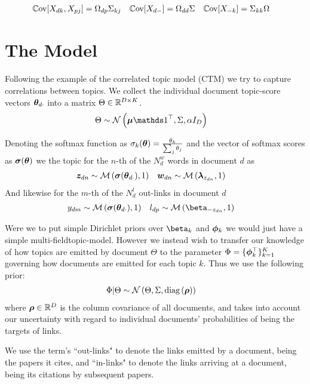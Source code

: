 \begin{align}
\mathbb{C}\text{ov}[ X_{dk}, X_{pj} ] & = \Omega_{dp} \Sigma_{kj} &
\mathbb{C}\text{ov}[ X_{d-} ] & = \Omega_{dd} \Sigma &
\mathbb{C}\text{ov}[ X_{-k} ] & = \Sigma_{kk} \Omega \label{eqn:sep-cov-forms}
\end{align}


\section{The Model}
Following the example of the correlated topic model (CTM)\cite{Blei2006} we try to capture correlations between topics. We collect the individual document topic-score vectors ${ \bm \theta_{d\cdot} }$ into a matrix $\Theta \in { \mathbb{R}^{D \times K} }$. 
\begin{align}
\Theta &\sim \mnor{\vv{\mu}\one\T}{\Sigma}{\alpha I_D}
\end{align}

Denoting the softmax function as $\sigma_k(\bm \theta) = \frac{\theta_k}{\sum_j \theta_j}$ and the vector of softmax scores as $\bm \sigma(\bm \theta)$ we 
the topic for the $n$-th of the $N^w_d$ words in document $d$ as
\begin{align}
{  \bm z _{dn} } & \sim \mathcal{M} \left( {\bm \sigma({ \bm \theta_{d\cdot} })},{1} \right) &
{ \bm w_{dn} } & \sim \mathcal{M} \left( {\bm \lambda_{z_{dn}}},{1} \right)
\end{align}
And likewise for the $m$-th of the $N^l_d$ out-links in document $d$
\begin{align}
y_{dm} & \sim \muln{\vv{\sigma}(\thdo)}{1} &
l_{dp} & \sim \muln{\vv{\beta}_{- z_{dn}}}{1}
\end{align}

Were we to put simple Dirichlet priors over $\vv{\beta}_k$ and $\bm \phi_k$ we would just have a simple multi-fieldtopic-model\cite{Blei2003}. However we instead wish to transfer our knowledge of how topics are emitted by document $\Theta$ to the parameter $\Phi = \{ \bm \phi_k^\top \}_{k=1}^K$ governing how documents are emitted for each topic $k$. Thus we use the following prior:
\begin{align}
\Phi|\Theta & \sim \mathcal{N} \left(\Theta, \Sigma, \text{diag} \left( {\bm \rho} \right)\right)
\end{align}
where $\bm \rho \in { \mathbb{R}^{D} }$ is the column covariance of all documents, and takes into account our uncertainty with regard to individual documents' probabilities of being the targets of links.

We use the term's ``out-links" to denote the links emitted by a document, being the papers it cites, and ``in-links" to denote the links arriving at a document, being its citations by subsequent papers.

